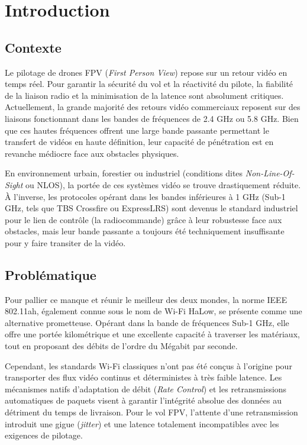 \section{Introduction}

\subsection{Contexte}
Le pilotage de drones FPV (\textit{First Person View}) repose sur un retour vidéo en temps réel. 
Pour garantir la sécurité du vol et la réactivité du pilote, la fiabilité de la liaison radio et 
la minimisation de la latence sont absolument critiques. Actuellement, la grande majorité des retours 
vidéo commerciaux reposent sur des liaisons fonctionnant dans les bandes de fréquences de 2.4 GHz ou 
5.8 GHz. Bien que ces hautes fréquences offrent une large bande passante permettant le transfert 
de vidéos en haute définition, leur capacité de pénétration est en revanche médiocre face aux obstacles 
physiques. 

En environnement urbain, forestier ou industriel (conditions dites \textit{Non-Line-Of-Sight} ou NLOS), 
la portée de ces systèmes vidéo se trouve drastiquement réduite. À l'inverse, les protocoles opérant 
dans les bandes inférieures à 1 GHz (Sub-1 GHz, tels que TBS Crossfire ou ExpressLRS) sont devenus le 
standard industriel pour le lien de contrôle (la radiocommande) grâce à leur robustesse face 
aux obstacles, mais leur bande passante a toujours été techniquement insuffisante pour y faire transiter 
de la vidéo.

\subsection{Problématique}
Pour pallier ce manque et réunir le meilleur des deux mondes, la norme IEEE 802.11ah, également connue 
sous le nom de Wi-Fi HaLow, se présente comme une alternative prometteuse. Opérant dans la bande de 
fréquences Sub-1 GHz, elle offre une portée kilométrique et une excellente capacité à traverser les 
matériaux, tout en proposant des débits de l'ordre du Mégabit par seconde. 

Cependant, les standards Wi-Fi classiques n'ont pas été conçus à l'origine pour transporter des flux 
vidéo continus et déterministes à très faible latence. Les mécanismes natifs d'adaptation de débit 
(\textit{Rate Control}) et les retransmissions automatiques de paquets visent à garantir l'intégrité 
absolue des données au détriment du temps de livraison. Pour le vol FPV, l'attente d'une retransmission 
introduit une gigue (\textit{jitter}) et une latence totalement incompatibles avec les exigences de 
pilotage.

